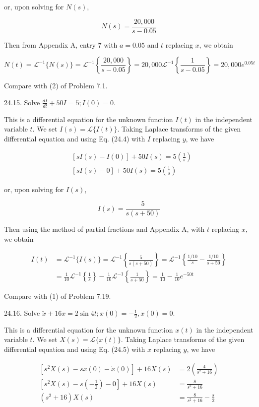 \documentclass[10pt]{article}
\begin{document}
or, upon solving for $N(s)$,

$$
N(s)=\frac{20,000}{s-0.05}
$$

Then from Appendix A, entry 7 with $a=0.05$ and $t$ replacing $x$, we obtain

$$
N(t)=\mathscr{L}^{-1}\{N(s)\}=\mathscr{L}^{-1}\left\{\frac{20,000}{s-0.05}\right\}=20,000 \mathscr{L}^{-1}\left\{\frac{1}{s-0.05}\right\}=20,000 e^{0.05 t}
$$

Compare with (2) of Problem 7.1.

24.15. Solve $\frac{d I}{d t}+50 I=5 ; I(0)=0$.

This is a differential equation for the unknown function $I(t)$ in the independent variable $t$. We set $I(s)=\mathscr{L}\{I(t)\}$. Taking Laplace transforms of the given differential equation and using Eq. (24.4) with $I$ replacing $y$, we have

$$
\begin{aligned}
& {[s I(s)-I(0)]+50 I(s)=5\left(\frac{1}{s}\right)} \\
& {[s I(s)-0]+50 I(s)=5\left(\frac{1}{s}\right)}
\end{aligned}
$$

or, upon solving for $I(s)$,

$$
I(s)=\frac{5}{s(s+50)}
$$

Then using the method of partial fractions and Appendix A, with $t$ replacing $x$, we obtain

$$
\begin{aligned}
I(t) & =\mathscr{L}^{-1}\{I(s)\}=\mathscr{L}^{-1}\left\{\frac{5}{s(s+50)}\right\}=\mathscr{L}^{-1}\left\{\frac{1 / 10}{s}-\frac{1 / 10}{s+50}\right\} \\
& =\frac{1}{10} \mathscr{L}^{-1}\left\{\frac{1}{s}\right\}-\frac{1}{10} \mathscr{L}^{-1}\left\{\frac{1}{s+50}\right\}=\frac{1}{10}-\frac{1}{10} e^{-50 t}
\end{aligned}
$$

Compare with (1) of Problem 7.19.

24.16. Solve $\ddot{x}+16 x=2 \sin 4 t ; x(0)=-\frac{1}{2}, \dot{x}(0)=0$.

This is a differential equation for the unknown function $x(t)$ in the independent variable $t$. We set $X(s)=\mathscr{L}\{x(t)\}$. Taking Laplace transforms of the given differential equation and using Eq. (24.5) with $x$ replacing $y$, we have

$$
\begin{aligned}
{\left[s^{2} X(s)-s x(0)-\dot{x}(0)\right]+16 X(s) } & =2\left(\frac{4}{s^{2}+16}\right) \\
{\left[s^{2} X(s)-s\left(-\frac{1}{2}\right)-0\right]+16 X(s) } & =\frac{8}{s^{2}+16} \\
\left(s^{2}+16\right) X(s) & =\frac{8}{s^{2}+16}-\frac{s}{2}
\end{aligned}
$$
\end{document}
